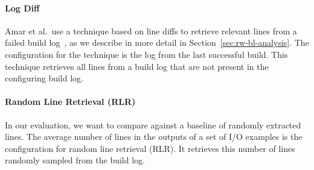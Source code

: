 \documentclass[\myrootdir/main.tex]{subfiles}
\begin{document}
\paragraph{Log Diff}
Amar et al.\ use a technique based on line diffs to retrieve relevant lines from a failed build log~\cite{amar2019mining}, as we describe in more detail in Section~\ref{sec:rw-bl-analysis}.
The configuration for the technique is the log from the last successful build.
This technique retrieves all lines from a build log that are not present in the configuring build log.
\paragraph{Random Line Retrieval (RLR)}
In our evaluation, we want to compare against a baseline of randomly extracted lines.
The average number of lines in the outputs of a set of I/O examples is the configuration for random line retrieval (RLR).
It retrieves this number of lines randomly sampled from the build log.
\end{document}
